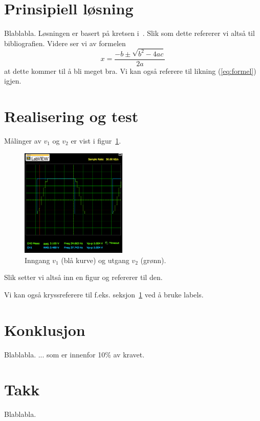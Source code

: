 \documentclass[a4paper,11pt,norsk]{article}
\begin{document}
\section{Prinsipiell løsning}
\label{sec:prinsipielllosning}

Blablabla. Løsningen er basert på kretsen i~\cite[s. 1604]{bibelen}. Slik som dette refererer vi altså til bibliografien. Videre ser vi av formelen
\begin{equation}
  \label{eq:formel}
  x = \frac{-b \pm \sqrt{b^{2}-4ac}}{2a}
\end{equation}
at dette kommer til å bli meget bra. Vi kan også referere til likning (\ref{eq:formel}) igjen.

\section{Realisering og test}
\label{sec:realisering}

Målinger av $v_1$ og $v_2$ er vist i figur~\ref{fig:resultat}.
\begin{figure}[htbp]
  \centering
  \includegraphics[width=0.45\textwidth]{skop} 
  \caption{Inngang $v_1$ (blå kurve) og utgang $v_2$ (grønn).}
  \label{fig:resultat}
\end{figure}

Slik setter vi altså inn en figur og refererer til den. 

Vi kan også kryssreferere til f.eks. seksjon~\ref{sec:prinsipielllosning} ved å bruke labels.



\section{Konklusjon}
\label{sec:konklusjon}

Blablabla. ... som er innenfor 10\% av kravet.

\section{Takk}
Blablabla.
\end{document}
